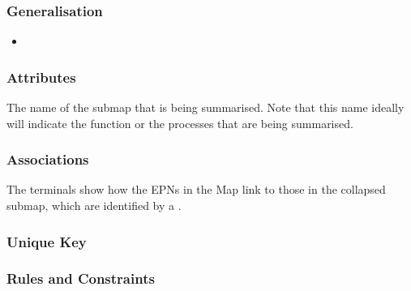 \subsubsection{Generalisation}

\begin{itemize}
\item {}
\end{itemize}

\subsubsection{Attributes}

\begin{attributes}
   The name of the submap that is being
  summarised. Note that this name ideally will indicate the function
  or the processes that are being summarised.
\end{attributes}

\subsubsection{Associations}

\begin{attributes}
 The terminals show how the
EPNs in the Map link to those in the collapsed submap,
which are identified by a .
\end{attributes}

\subsubsection{Unique Key}

\begin{logicalkey}
  \item {}
  \item {}
\end{logicalkey}

\subsubsection{Rules and Constraints}

\begin{valrules}
\end{valrules}

